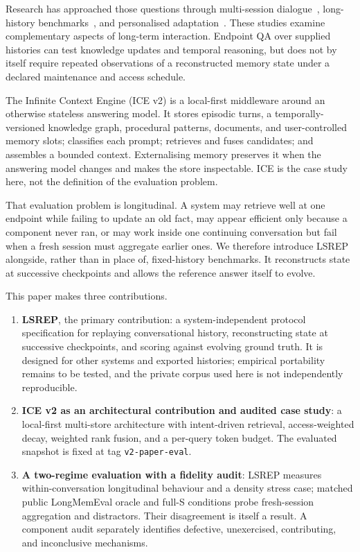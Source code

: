 \documentclass[11pt,a4paper]{article}
\begin{document}
Research has approached those questions through multi-session dialogue~\citep{xu2022msc,jang2023chronicles}, long-history benchmarks~\citep{maharana2024locomo,wu2025longmemeval}, and personalised adaptation~\citep{salemi2024lamp}. These studies examine complementary aspects of long-term interaction. Endpoint QA over supplied histories can test knowledge updates and temporal reasoning, but does not by itself require repeated observations of a reconstructed memory state under a declared maintenance and access schedule.

The Infinite Context Engine (ICE v2) is a local-first middleware around an otherwise stateless answering model. It stores episodic turns, a temporally-versioned knowledge graph, procedural patterns, documents, and user-controlled memory slots; classifies each prompt; retrieves and fuses candidates; and assembles a bounded context. Externalising memory preserves it when the answering model changes and makes the store inspectable. ICE is the case study here, not the definition of the evaluation problem.

That evaluation problem is longitudinal. A system may retrieve well at one endpoint while failing to update an old fact, may appear efficient only because a component never ran, or may work inside one continuing conversation but fail when a fresh session must aggregate earlier ones. We therefore introduce LSREP alongside, rather than in place of, fixed-history benchmarks. It reconstructs state at successive checkpoints and allows the reference answer itself to evolve.

This paper makes three contributions.

\begin{enumerate}[leftmargin=*]
  \item \textbf{LSREP}, the primary contribution: a system-independent protocol specification for replaying conversational history, reconstructing state at successive checkpoints, and scoring against evolving ground truth. It is designed for other systems and exported histories; empirical portability remains to be tested, and the private corpus used here is not independently reproducible.
  \item \textbf{ICE v2 as an architectural contribution and audited case study}: a local-first multi-store architecture with intent-driven retrieval, access-weighted decay, weighted rank fusion, and a per-query token budget. The evaluated snapshot is fixed at tag \texttt{v2-paper-eval}.
  \item \textbf{A two-regime evaluation with a fidelity audit}: LSREP measures within-conversation longitudinal behaviour and a density stress case; matched public LongMemEval oracle and full-S conditions probe fresh-session aggregation and distractors. Their disagreement is itself a result. A component audit separately identifies defective, unexercised, contributing, and inconclusive mechanisms.
\end{enumerate}
\end{document}

